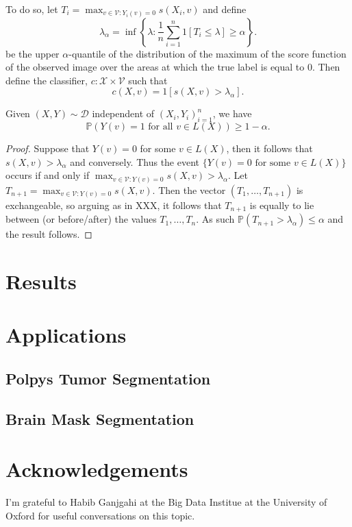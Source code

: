 To do so, let $T_i = \max_{v \in \mathcal{V}: Y_i(v) = 0} s(X_i,v)$ and define
\begin{equation*}
	\lambda_{\alpha} = \inf\left\lbrace \lambda: \frac{1}{n} \sum_{i = 1}^n 1\left[ T_i \leq \lambda \right] \geq \alpha \right\rbrace.
\end{equation*}
be the upper $\alpha$-quantile of the distribution of the maximum of the score function of the observed image over the areas at which the true label is equal to 0. Then define the classifier, $c: \mathcal{X} \times \mathcal{V}$ such that
\begin{equation*}
	c(X, v) = 1[s(X,v)> \lambda_{\alpha}].
\end{equation*}
\begin{theorem}
	Given $(X,Y) \sim \mathcal{D}$ independent of $(X_i, Y_i)_{i = 1}^n$, we have
	\begin{equation*}
		\mathbb{P}\left( Y(v) = 1 \text{ for all } v \in L(X) \right) \geq 1 - \alpha.
	\end{equation*}
\end{theorem}
\begin{proof}
	Suppose that $Y(v) = 0$ for some $v \in L(X)$, then it follows that $s(X,v) > \lambda_\alpha$ and conversely. Thus the event $\lbrace Y(v) = 0 \text{ for some } v \in L(X) \rbrace$ occurs if and only if $\max_{v \in \mathcal{V}: Y(v) = 0} s(X,v) >  \lambda_\alpha$. Let $T_{n+1} = \max_{v \in \mathcal{V}: Y(v) = 0} s(X,v)$. Then the vector $(T_1, \dots, T_{n+1})$ is exchangeable, so arguing as in XXX, it follows that $T_{n+1}$ is equally to lie between (or before/after) the values $T_1, \dots, T_n$. As such 
	$\mathbb{P}\left( T_{n+1} > \lambda_{\alpha}\right) \leq \alpha$
	and the result follows.
\end{proof}

\section{Results}
\section{Applications}

\subsection{Polpys Tumor Segmentation}

\subsection{Brain Mask Segmentation}


\section{Acknowledgements}
I'm grateful to Habib Ganjgahi at the Big Data Institue at the University of Oxford for useful conversations on this topic. 
